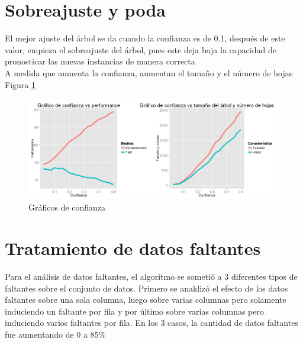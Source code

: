 \documentclass[]{article}
\begin{document}
\section{Sobreajuste y poda}

El mejor ajuste del árbol se da cuando la confianza es de 0.1, después de este valor, empieza el sobreajuste del árbol, pues este deja baja la capacidad de pronosticar las nuevas instancias de manera correcta\\
A medida que aumenta la confianza, aumentan el tamaño y el número de hojas Figura \ref{1.P1Conf}


\begin{figure}[H]
	\includegraphics[scale = 0.4]{1_3_Conf_Perf_Num}
	\caption[Confianza vs ajuste]{Gráficos de confianza}
	\label{1.P1Conf}
\end{figure}
%
%






\section{Tratamiento de datos faltantes}
Para el análisis de datos faltantes, el algoritmo se sometió a 3 diferentes tipos de faltantes sobre el conjunto de datos. Primero se anaklizó el efecto de los datos faltantes sobre una sola columna, luego sobre varias columnas pero solamente induciendo un faltante por fila y por último sobre varias columnas pero induciendo varios faltantes por fila. En los 3 casos, la cantidad de datos faltantes fue aumentando de 0 a 85\%
\end{document}
